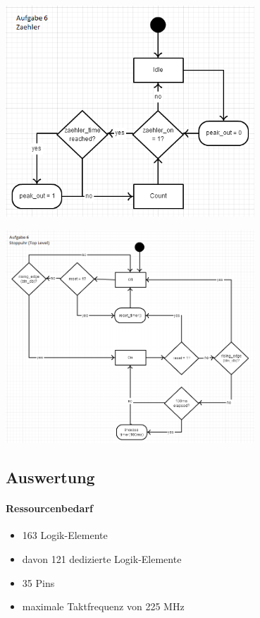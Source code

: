 		\includegraphics[width=0.7\textwidth]{resources/06-Zaehler.png}

		\includegraphics[width=0.7\textwidth]{resources/06-Stoppuhr.png}
 
\subsection{Auswertung}
	\paragraph{Ressourcenbedarf}
	\begin{itemize} 
	\item 163 Logik-Elemente
	\item davon 121 dedizierte Logik-Elemente
	\item 35 Pins 
	\item maximale Taktfrequenz von 225 MHz
	\end{itemize}
